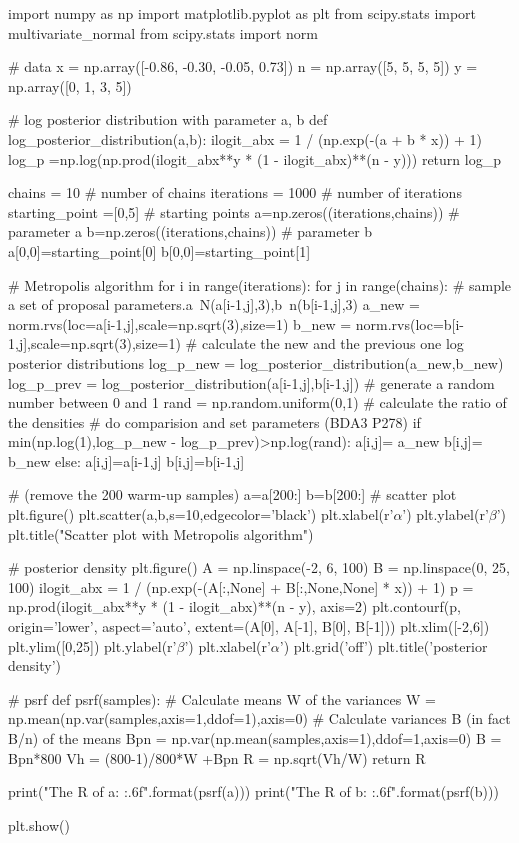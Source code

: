 \documentclass[article,11pt]{article}
\begin{document}
\begin{python}
import numpy as np
import matplotlib.pyplot as plt
from scipy.stats import multivariate_normal
from scipy.stats import norm

# data
x = np.array([-0.86, -0.30, -0.05, 0.73])
n = np.array([5, 5, 5, 5])
y = np.array([0, 1, 3, 5])

# log posterior distribution with parameter a, b
def log_posterior_distribution(a,b):
	ilogit_abx = 1 / (np.exp(-(a + b * x)) + 1)
	log_p =np.log(np.prod(ilogit_abx**y * (1 - ilogit_abx)**(n - y)))
	return log_p

chains = 10  # number of chains
iterations = 1000  # number of iterations
starting_point =[0,5]  # starting points
a=np.zeros((iterations,chains))  # parameter a
b=np.zeros((iterations,chains))  # parameter b
a[0,0]=starting_point[0]
b[0,0]=starting_point[1]

# Metropolis algorithm
for i in range(iterations):
	for j in range(chains):
	# sample a set of proposal parameters.a~N(a[i-1,j],3),b~n(b[i-1,j],3)
	a_new = norm.rvs(loc=a[i-1,j],scale=np.sqrt(3),size=1) 
	b_new = norm.rvs(loc=b[i-1,j],scale=np.sqrt(3),size=1)
	# calculate the new and the previous one log posterior distributions
	log_p_new = log_posterior_distribution(a_new,b_new)
	log_p_prev = log_posterior_distribution(a[i-1,j],b[i-1,j])
	# generate a random number between 0 and 1
	rand = np.random.uniform(0,1)
	# calculate the ratio of the densities
	# do comparision and set parameters (BDA3 P278)
	if min(np.log(1),log_p_new - log_p_prev)>np.log(rand):
		a[i,j]= a_new
		b[i,j]= b_new
	else:
		a[i,j]=a[i-1,j]
		b[i,j]=b[i-1,j]

# (remove the 200 warm-up samples)
a=a[200:]
b=b[200:]
# scatter plot
plt.figure()
plt.scatter(a,b,s=10,edgecolor='black')  
plt.xlabel(r'$\alpha$')
plt.ylabel(r'$\beta$')
plt.title("Scatter plot with Metropolis algorithm")

# posterior density 
plt.figure()
A = np.linspace(-2, 6, 100)
B = np.linspace(0, 25, 100)
ilogit_abx = 1 / (np.exp(-(A[:,None] + B[:,None,None] * x)) + 1)
p = np.prod(ilogit_abx**y * (1 - ilogit_abx)**(n - y), axis=2)
plt.contourf(p, origin='lower', aspect='auto', 
extent=(A[0], A[-1], B[0], B[-1]))
plt.xlim([-2,6])
plt.ylim([0,25])
plt.ylabel(r'$\beta$')
plt.xlabel(r'$\alpha$')
plt.grid('off')
plt.title('posterior density')

# psrf
def psrf(samples):
	# Calculate means W of the variances
	W = np.mean(np.var(samples,axis=1,ddof=1),axis=0)
	# Calculate variances B (in fact B/n) of the means
	Bpn = np.var(np.mean(samples,axis=1),ddof=1,axis=0)
	B = Bpn*800
	Vh = (800-1)/800*W +Bpn
	R = np.sqrt(Vh/W)
	return R

print("The R of a: {:.6f}".format(psrf(a)))
print("The R of b: {:.6f}".format(psrf(b)))

plt.show()

\end{python}
\end{document}
